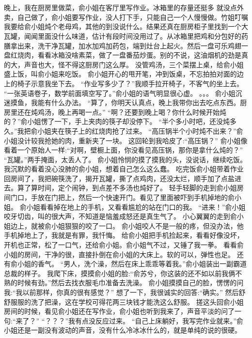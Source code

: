 \chapter{}
晚上，我在厨房里做菜，俞小姐在客厅里写作业。冰箱里的存量还挺多 就没点外卖，自己做了，俞小姐要写作业，没人打下手，只能自己一个人慢慢做。竹姐叮嘱我要给俞小姐炖个老母鸡，其他的到没说什么。结果还真在厨房柜子里找到一个大瓦罐，闻闻里面没什么味道，估计有段时间没用过了。从冰箱里把鸡和分包好的药膳拿出来，洗干净瓦罐，加水加鸡加药包，端到灶台上起火。然后一盘可乐鸡翅一盘红烧肉，看看冰箱没啥素菜，做了一盘番茄炒蛋。别的不说，这油烟机的劲是真的大，声音也大，怪不得这厨房门这么厚。
没管鸡汤，三个菜摆上桌，给俞小姐盛上饭，叫俞小姐来吃饭。
俞小姐开心的甩开笔，冲到饭桌，不忘拍拍对面的边上的椅子示意我坐下去。
“作业写多少了？”我顺手拉开椅子，不客气的坐上去。
“一张英语卷子，数学前面填空写了。”俞小姐的语气明显很心虚。
。。。
俞小姐沉迷摸鱼，我能有什么办法。
“算了，你明天认真点，晚上我带你出去吃点东西。厨房里还在炖鸡汤，晚上再喝一点。”
“啊？还要到晚上喝？你什么时候开始炖的？”俞小姐愣了一下，手上夹肉的筷子却没停下。
“半个多小时吧，还没炖多久。”我把俞小姐夹在筷子上的红烧肉抢了过来。
“高压锅半个小时炖不出来？”俞小姐没计较我抢她的肉，重新夹了一块。
这回轮到我哈皮了:“高压锅？”
俞小姐像看着一个原始人一样:“对啊，壁橱上面，你没看见高压锅，那你是拿什么炖的？”
“瓦罐。”两手掩面，太丢人了。
俞小姐怜悯的摸了摸我的头，没说话，继续吃饭。
我沉默的看着没心没肺的俞小姐，想着自己怎么这么蠢。
吃完饭俞小姐带着作业回房间了，我把碗筷洗了，揭开瓦罐，撕了点鸡肉，还没太烂，顺手加了点盐进去。算了算时间，定个闹钟，到点差不多汤也炖好了。
轻手轻脚的走到俞小姐房间门口，手放在门把上，然后一个快速开门。看见了里面被吓到手机掉地的俞小姐。
俞小姐看看掉在地上的手机，又看看尴尬的站在门口的我。
“进来！”俞小姐咬牙切齿，叫的很大声，不知道是恼羞成怒还是真生气了。
小心翼翼的走到俞小姐边上，就被俞小姐狠狠的咬了一口。
俞小姐咬人不是一般的疼，但没办法，他手机掉地上了，我就是有罪，我忏悔。
给俞小姐把手机捡起来，看看好像没坏，开机也正常，松了一口气，还给俞小姐。俞小姐气不过，又锤了我一拳。
看看俞小姐的房间，干净的很，直接扑倒在俞小姐的大床上。软的可以，弹性也足。
还有俞小姐的香气。
“男人，洗个澡，然后在床上乖乖等着我。”俞小姐装出一副霸道总裁的样子。
我爬下床，摸摸俞小姐的脸:“俞苏兮，你这装的还不如以前我俩不熟的时候有劲。”然后去找衣服毛巾准备去洗澡。
俞小姐摸摸自己的脸，愣愣的问我:“我以前那样，你真的很有感觉？”
想了一下，我很诚实的回答:“确实。”
然后舒舒服服的洗了把澡，这在学校可得花两三块钱才能洗这么舒服。
搓这头回俞小姐房间的时候，看见俞小姐还在写作业，俞小姐也听到我来了，声音平淡的问了一句:“来了？”
“？？？”我有点没反应过来。
“自己上床躺好，我写完作业就来。”俞小姐还是一副没有波动的声音，没有什么冷冰冰什么的，就是单纯的说的很硬。
